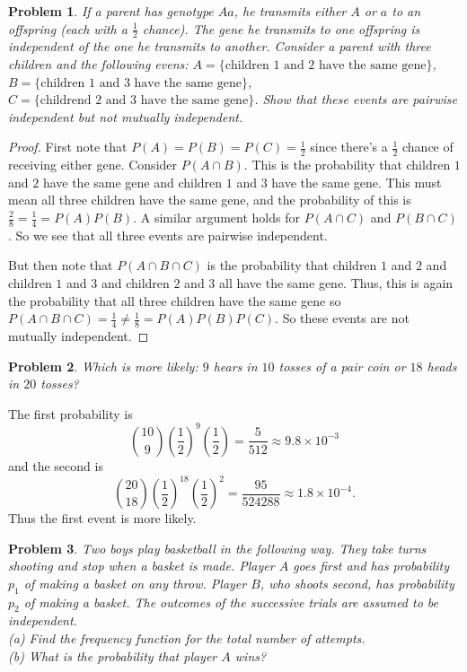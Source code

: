 \documentclass{article}
\newtheorem{problem}{Problem}
\begin{document}
\begin{problem}
If a parent has genotype $Aa$, he transmits either $A$ or $a$ to an offspring (each with a $\frac{1}{2}$ chance). The gene he transmits to one offspring is independent of the one he transmits to another. Consider a parent with three children and the following evens: $A = \{\text{children $1$ and $2$ have the same gene}\}$, $B = \{\text{children $1$ and $3$ have the same gene}\}$, $C = \{\text{childrend $2$ and $3$ have the same gene}\}$. Show that these events are pairwise independent but not mutually independent.
\end{problem}
\begin{proof}
First note that $P(A) = P(B) = P(C) = \frac{1}{2}$ since there's a $\frac{1}{2}$ chance of receiving either gene. Consider $P(A \cap B)$. This is the probability that children $1$ and $2$ have the same gene and children $1$ and $3$ have the same gene. This must mean all three children have the same gene, and the probability of this is $\frac{2}{8} = \frac{1}{4} = P(A)P(B)$. A similar argument holds for $P(A \cap C)$ and $P(B \cap C)$. So we see that all three events are pairwise independent.

But then note that $P(A \cap B \cap C)$ is the probability that children $1$ and $2$ and children $1$ and $3$ and children $2$ and $3$ all have the same gene. Thus, this is again the probability that all three children have the same gene so $P(A \cap B \cap C) = \frac{1}{4} \neq \frac{1}{8} = P(A)P(B)P(C)$. So these events are not mutually independent.
\end{proof}

\begin{problem}
Which is more likely: $9$ hears in $10$ tosses of a pair coin or $18$ heads in $20$ tosses?
\end{problem}

The first probability is
\[
\binom{10}{9} \left ( \frac{1}{2} \right )^9 \left ( \frac{1}{2} \right ) = \frac{5}{512} \approx 9.8 \times 10^{-3}
\]
and the second is
\[
\binom{20}{18} \left ( \frac{1}{2} \right )^{18} \left ( \frac{1}{2} \right )^2 = \frac{95}{524288} \approx 1.8 \times 10^{-4}.
\]
Thus the first event is more likely.

\begin{problem}
Two boys play basketball in the following way. They take turns shooting and stop when a basket is made. Player $A$ goes first and has probability $p_1$ of making a basket on any throw. Player $B$, who shoots second, has probability $p_2$ of making a basket. The outcomes of the successive trials are assumed to be independent.\\
(a) Find the frequency function for the total number of attempts.\\
(b) What is the probability that player $A$ wins?\\
\end{problem}
\end{document}
